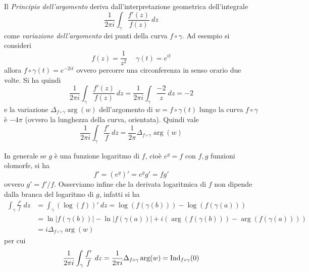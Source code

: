 \begin{remark}
  Il \emph{Principio dell'argomento} deriva dall'interpretazione geometrica
  dell'integrale \begin{equation*}
    \frac{1}{2\pi i} \int_{\gamma} \frac{f'(z)}{f(z)}\ dz
  \end{equation*}
  come \emph{variazione dell'argomento} dei punti della curva $f \circ \gamma$.
  Ad esempio si consideri 
  \begin{equation*}
    f(z) = \frac{1}{z^2} \quad\ \gamma(t) = e^{it} 
  \end{equation*}
  allora $f \circ \gamma(t) = e^{-2it}$ ovvero percorre una circonferenza in
  senso orario due volte. Si ha quindi 
  \begin{equation*}
    \frac{1}{2\pi i} \int_{\gamma} \frac{f'(z)}{f(z)}\ dz
    = \frac{1}{2\pi i} \int_{\gamma} \frac{-2}{z}\ dz = -2
  \end{equation*}
  e la variazione $\Delta_{f \circ \gamma} \operatorname{arg}(w)$ dell'argomento
  di $w = f \circ \gamma(t)$ lungo la curva $f \circ \gamma$ è $-4\pi$ (ovvero
  la lunghezza della curva, orientata). Quindi vale 
  \begin{equation*}
    \frac{1}{2\pi i} \int_{\gamma} \frac{f'}{f}\ dz = \frac{1}{2\pi}
    \Delta_{f\circ \gamma}\operatorname{arg}(w)
  \end{equation*}

  In generale se $g$ è una funzione logaritmo di $f$, cioè $e^{g} = f$ con $f,g$
  funzioni olomorfe, si ha 
  \begin{equation*}
    f' = (e^g)' = e^g g' = fg'
  \end{equation*}
  ovvero $g' = f'/f$. Osserviamo infine che la derivata logaritmica di $f$ non
  dipende dalla branca del logaritmo di $g$, infatti si ha 
  \begin{align*}
    \int_{\gamma} \frac{f'}{f}\ dz & = \int_{\gamma} (\log(f))' \ dz
    = \log(f(\gamma(b))) - \log(f(\gamma(a)))\\
    & = \ln |f(\gamma(b))| - \ln |f(\gamma(a))|
    + i(\operatorname{arg}(f(\gamma(b))) - \operatorname{arg}(f(\gamma(a)))) \\
    & = i \Delta_{f \circ \gamma} \operatorname{arg}(w)
  \end{align*}
  per cui 
  \begin{equation*}
    \frac{1}{2\pi i} \int_{\gamma} \frac{f'}{f}\ dz = \frac{1}{2\pi i}
    \Delta_{f\circ \gamma}\operatorname{arg}(w) = \operatorname{Ind}_{f\circ \gamma}(0)
  \end{equation*}
  \label{rmk:motivazione_principio_argomento}
\end{remark}

